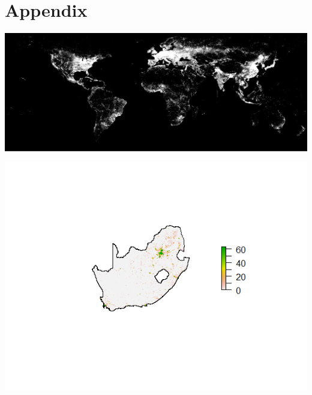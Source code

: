 \documentclass[11pt,preprint, authoryear]{elsarticle}
\let\origfigure\figure
\let\endorigfigure\endfigure
\renewenvironment{figure}[1][2] {
    \expandafter\origfigure\expandafter[H]
} {
    \endorigfigure
}
\numberwithin{equation}{section}
\numberwithin{figure}{section}
\numberwithin{table}{section}
\begin{document}
\newpage

\hypertarget{appendix}{%
\section*{Appendix}\label{appendix}}

\begin{figure}[H]
\includegraphics[width=1\linewidth]{figures/built_2011} \caption{\label{builtup} Interpolated 2014 built-up data from GHSL}\label{fig:builtup}
\end{figure}

\begin{figure}[H]
\includegraphics[width=1\linewidth]{figures/finalf14} \caption{\label{finalf142001} Final Local Human Lights Image for the F14 satellite for 2001}\label{fig:finalf142001}
\end{figure}
\end{document}
